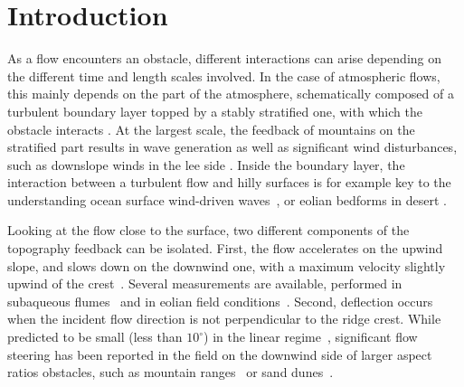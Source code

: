 \begin{abstract}


\end{abstract}

\newpage

\section{Introduction}

As a flow encounters an obstacle, different interactions can arise depending on the different time and length scales involved. In the case of atmospheric flows, this mainly depends on the part of the atmosphere, schematically composed of a turbulent boundary layer topped by a stably stratified one, with which the obstacle interacts \citep{Stull1988}.
%
At the largest scale, the feedback of mountains on the stratified part results in wave generation as well as significant wind disturbances, such as downslope winds in the lee side \citep{Duran1990}. Inside the boundary layer, the interaction between a turbulent flow and hilly surfaces is for example key to the understanding ocean surface wind-driven waves~\citep{Sullivan2010}, or eolian bedforms in desert \citep{Courrech2015}.

Looking at the flow close to the surface, two different components of the topography feedback can be isolated. First, the flow accelerates on the upwind slope, and slows down on the downwind one, with a maximum velocity slightly upwind of the crest~\citep{Jackson1975, Sykes1980, Hunt1988}. Several measurements are available, performed in subaqueous flumes~\citep{Zilker1977, Zilker1979, Frederick1988} and in eolian field conditions~\citep{Claudin2013, Lu2021}. Second, deflection occurs when the incident flow direction is not perpendicular to the ridge crest. While predicted to be small (less than $10^{\circ}$) in the linear regime~\citep{Gadal2019}, significant flow steering has been reported in the field on the downwind side of larger aspect ratios obstacles, such as mountain ranges~\citep{Kim2000, Lewis2008, Fernando2019} or sand dunes~\citep{Walker2009, Walker2013, Hesp2015, Smith2017}.


